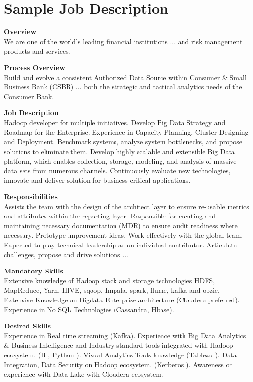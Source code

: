 \section{Sample Job Description}

\begin{tcolorbox}[colback=boxbackground,colframe=boxframe,sharp corners]

\noindent \textbf{Overview}\\
We are one of the world’s leading financial institutions ... and risk management products and services.

\noindent \textbf{Process Overview}\\
Build and evolve a consistent Authorized Data Source within Consumer \& Small Business Bank (CSBB) ... both the strategic and tactical analytics needs of the Consumer Bank.

\noindent \textbf{Job Description}\\
Hadoop developer for multiple initiatives. Develop Big Data Strategy and Roadmap for the Enterprise. Experience in Capacity Planning, Cluster Designing and Deployment. Benchmark systems, analyze system bottlenecks, and propose solutions to eliminate them. Develop highly scalable and extensible Big Data platform, which enables collection, storage, modeling, and analysis of massive data sets from numerous channels. Continuously evaluate new technologies, innovate and deliver solution for business-critical applications.

\noindent \textbf{Responsibilities}\\
Assists the team with the design of the architect layer to ensure re-usable metrics and attributes within the reporting layer. Responsible for creating and maintaining necessary documentation (MDR) to ensure audit readiness where necessary. Prototype improvement ideas. Work effectively with the global team. Expected to play technical leadership as an individual contributor. Articulate challenges, propose and drive solutions ...

\noindent \textbf{Mandatory Skills}\\
Extensive knowledge of Hadoop stack and storage technologies HDFS, MapReduce, Yarn, HIVE, sqoop, Impala, spark, flume, kafka and oozie. Extensive Knowledge on Bigdata Enterprise architecture (Cloudera preferred). Experience in No SQL Technologies (Cassandra, Hbase).

\noindent \textbf{Desired Skills}\\
Experience in Real time streaming (Kafka). Experience with Big Data Analytics \& Business Intelligence and Industry standard tools integrated with Hadoop ecosystem. (R , Python ). Visual Analytics Tools knowledge (Tableau ). Data Integration, Data Security on Hadoop ecosystem. (Kerberos ). Awareness or experience with Data Lake with Cloudera ecosystem.
\end{tcolorbox} 



